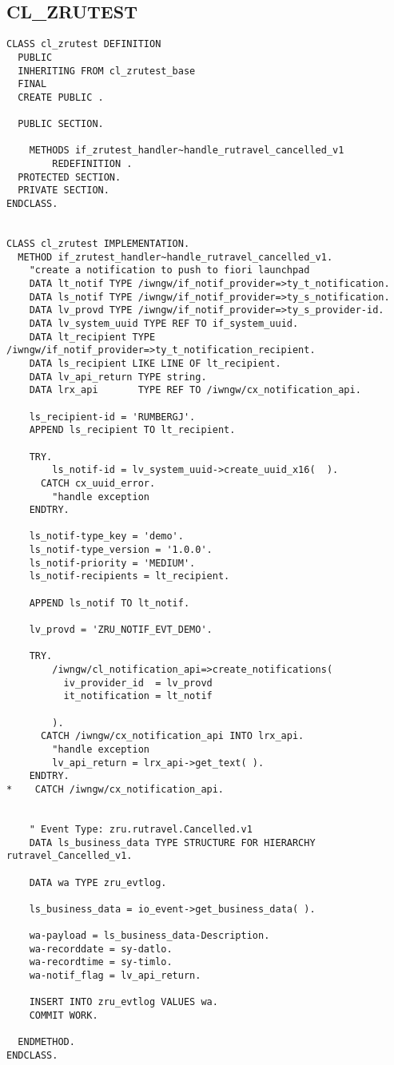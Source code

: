 \subsection{ CL\_ZRUTEST } 

\begin{Verbatim}[breaklines=true]
CLASS cl_zrutest DEFINITION
  PUBLIC
  INHERITING FROM cl_zrutest_base
  FINAL
  CREATE PUBLIC .

  PUBLIC SECTION.

    METHODS if_zrutest_handler~handle_rutravel_cancelled_v1
        REDEFINITION .
  PROTECTED SECTION.
  PRIVATE SECTION.
ENDCLASS.


CLASS cl_zrutest IMPLEMENTATION.
  METHOD if_zrutest_handler~handle_rutravel_cancelled_v1.
    "create a notification to push to fiori launchpad
    DATA lt_notif TYPE /iwngw/if_notif_provider=>ty_t_notification.
    DATA ls_notif TYPE /iwngw/if_notif_provider=>ty_s_notification.
    DATA lv_provd TYPE /iwngw/if_notif_provider=>ty_s_provider-id.
    DATA lv_system_uuid TYPE REF TO if_system_uuid.
    DATA lt_recipient TYPE /iwngw/if_notif_provider=>ty_t_notification_recipient.
    DATA ls_recipient LIKE LINE OF lt_recipient.
    DATA lv_api_return TYPE string.
    DATA lrx_api       TYPE REF TO /iwngw/cx_notification_api.

    ls_recipient-id = 'RUMBERGJ'.
    APPEND ls_recipient TO lt_recipient.

    TRY.
        ls_notif-id = lv_system_uuid->create_uuid_x16(  ).
      CATCH cx_uuid_error.
        "handle exception
    ENDTRY.

    ls_notif-type_key = 'demo'.
    ls_notif-type_version = '1.0.0'.
    ls_notif-priority = 'MEDIUM'.
    ls_notif-recipients = lt_recipient.

    APPEND ls_notif TO lt_notif.

    lv_provd = 'ZRU_NOTIF_EVT_DEMO'.

    TRY.
        /iwngw/cl_notification_api=>create_notifications(
          iv_provider_id  = lv_provd
          it_notification = lt_notif

        ).
      CATCH /iwngw/cx_notification_api INTO lrx_api.
        "handle exception
        lv_api_return = lrx_api->get_text( ).
    ENDTRY.
*    CATCH /iwngw/cx_notification_api.


    " Event Type: zru.rutravel.Cancelled.v1
    DATA ls_business_data TYPE STRUCTURE FOR HIERARCHY rutravel_Cancelled_v1.

    DATA wa TYPE zru_evtlog.

    ls_business_data = io_event->get_business_data( ).

    wa-payload = ls_business_data-Description.
    wa-recorddate = sy-datlo.
    wa-recordtime = sy-timlo.
    wa-notif_flag = lv_api_return.

    INSERT INTO zru_evtlog VALUES wa.
    COMMIT WORK.

  ENDMETHOD.
ENDCLASS.
\end{Verbatim}

